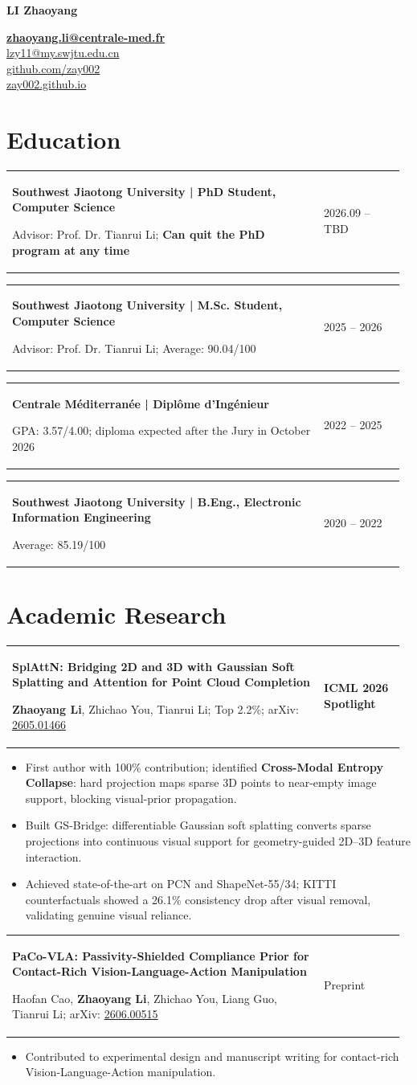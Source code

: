 \documentclass[a4paper,10pt]{article}
\makeatletter
\newcommand{\cvEntry}[3]{%
  \begingroup\renewcommand{\arraystretch}{0.78}%
  \noindent\begin{tabular*}{\linewidth}{@{}p{0.77\linewidth}@{\extracolsep{\fill}}p{0.20\linewidth}@{}}
    {\RaggedRight\textbf{#1}\par{\small #2}} & {\raggedleft\small #3\par} \\
  \end{tabular*}\endgroup\vspace{0pt}
}
\makeatother
\begin{document}
\begin{minipage}[t]{0.43\linewidth}
  \textbf{\LARGE LI Zhaoyang}
\end{minipage}\hfill
\begin{minipage}[t]{0.54\linewidth}\raggedleft\small
  \textbf{\href{mailto:zhaoyang.li@centrale-med.fr}{zhaoyang.li@centrale-med.fr}}\\
  \href{mailto:lzy11@my.swjtu.edu.cn}{lzy11@my.swjtu.edu.cn}\\
  \href{https://github.com/zay002}{github.com/zay002}\\
  \href{https://zay002.github.io}{zay002.github.io}
\end{minipage}
\vspace{6pt}

\section{Education}
\cvEntry{Southwest Jiaotong University | PhD Student, Computer Science}{Advisor: Prof. Dr. Tianrui Li; \textbf{Can quit the PhD program at any time}}{2026.09 -- TBD}
\cvEntry{Southwest Jiaotong University | M.Sc. Student, Computer Science}{Advisor: Prof. Dr. Tianrui Li; Average: 90.04/100}{2025 -- 2026}
\cvEntry{Centrale M\'editerran\'ee | Dipl\^ome d'Ing\'enieur}{GPA: 3.57/4.00; diploma expected after the Jury in October 2026}{2022 -- 2025}
\cvEntry{Southwest Jiaotong University | B.Eng., Electronic Information Engineering}{Average: 85.19/100}{2020 -- 2022}

\section{Academic Research}
\cvEntry{SplAttN: Bridging 2D and 3D with Gaussian Soft Splatting and Attention for Point Cloud Completion}{\textbf{Zhaoyang Li}, Zhichao You, Tianrui Li; Top 2.2\%; arXiv: \href{https://arxiv.org/abs/2605.01466}{2605.01466}}{\textbf{ICML 2026 Spotlight}}
\begin{itemize}
  \item First author with 100\% contribution; identified \textbf{Cross-Modal Entropy Collapse}: hard projection maps sparse 3D points to near-empty image support, blocking visual-prior propagation.
  \item Built GS-Bridge: differentiable Gaussian soft splatting converts sparse projections into continuous visual support for geometry-guided 2D--3D feature interaction.
  \item Achieved state-of-the-art on PCN and ShapeNet-55/34; KITTI counterfactuals showed a 26.1\% consistency drop after visual removal, validating genuine visual reliance.
\end{itemize}
\cvEntry{PaCo-VLA: Passivity-Shielded Compliance Prior for Contact-Rich Vision-Language-Action Manipulation}{Haofan Cao, \textbf{Zhaoyang Li}, Zhichao You, Liang Guo, Tianrui Li; arXiv: \href{https://arxiv.org/abs/2606.00515}{2606.00515}}{Preprint}
\begin{itemize}
  \item Contributed to experimental design and manuscript writing for contact-rich Vision-Language-Action manipulation.
\end{itemize}
\end{document}
